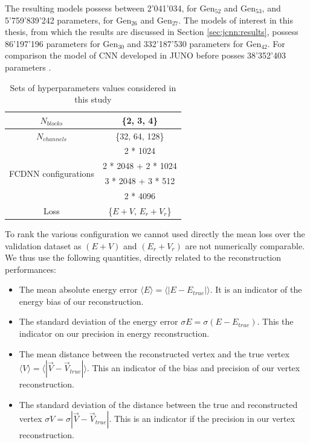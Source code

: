 \documentclass[../main.tex]{subfiles}
\begin{document}
{{\hfill

The resulting models possess between 2'041'034, for $\mathrm{Gen}_{52}$ and $\mathrm{Gen}_{53}$, and  5'759'839'242 parameters, for $\mathrm{Gen}_{26}$ and $\mathrm{Gen}_{27}$. The models of interest in this thesis, from which the results are discussed in Section \ref{sec:jcnn:results}, possess 86'197'196 parameters for $\mathrm{Gen}_{30}$ and 332'187'530 parameters for $\mathrm{Gen}_{42}$. For comparison the model of CNN developed in JUNO before posses 38'352'403 parameters \cite{qian_vertex_2021}.

\begin{table}[ht]
  \centering
  \begin{tabular}{ | c | c | }
    \hline $N_{blocks}$ & \{2, 3, 4\} \\
    \hline $N_{channels}$ & \{32, 64, 128\} \\
    \hline
    \multirow{4}{*}{FCDNN configurations} & 2 * 1024 \\
                                        & 2 * 2048 + 2 * 1024 \\
                                        & 3 * 2048 + 3 * 512 \\
                                        & 2 * 4096 \\
    \hline
    Loss & \{$E+V$, $E_r + V_r$\} \\
    \hline
  \end{tabular}
  \caption{Sets of hyperparameters values considered in this study}
  \label{tab:jcnn:hyper}
\end{table}


To rank the various configuration we cannot used directly the mean loss over the validation dataset as $(E+V)$ and $(E_r + V_r)$ are not numerically comparable. We thus use the following quantities, directly related to the reconstruction performances:
\begin{itemize}
  \item The mean absolute energy error $\langle E \rangle = \langle | E - E_{true} | \rangle$. It is an indicator of the energy bias of our reconstruction.
  \item The standard deviation of the energy error $\sigma E = \sigma (E - E_{true})$. This the indicator on our precision in energy reconstruction.
  \item The mean distance between the reconstructed vertex and the true vertex $\langle V \rangle = \langle | \vec{V} - \vec{V}_{true} | \rangle$. This an indicator of the bias and precision of our vertex reconstruction.
  \item The standard deviation of the distance between the true and reconstructed vertex $\sigma V = \sigma |\vec{V} - \vec{V}_{true}|$. This is an indicator if the precision in our vertex reconstruction.
\end{itemize}

}}
\end{document}
